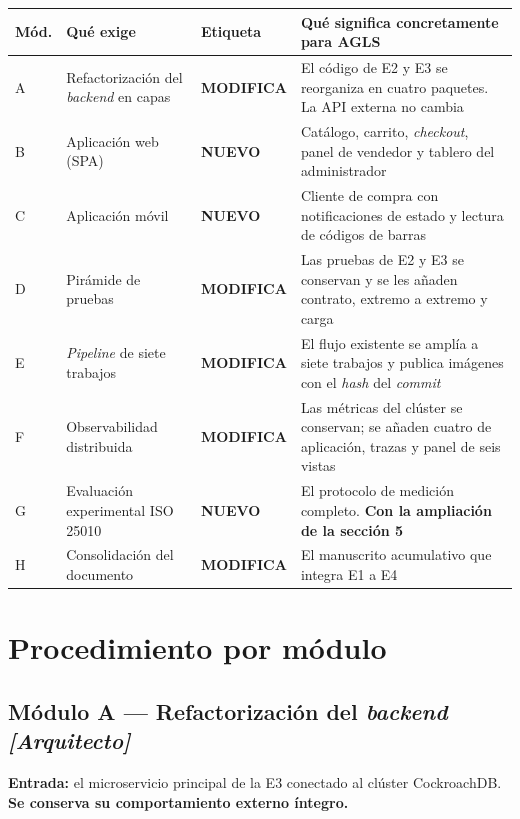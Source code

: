 \documentclass[11pt,a4paper]{article}
\newcommand{\cambia}{\cellcolor{filaCambia}\textbf{MODIFICA}}
\newcommand{\nuevo}{\cellcolor{filaNuevo}\textbf{NUEVO}}
\begin{document}
\begin{center}
	\footnotesize
	\begin{longtable}{@{}p{1.0cm}p{3.5cm}p{1.6cm}p{9.0cm}@{}}
		\toprule
		\textbf{Mód.} & \textbf{Qué exige} & \textbf{Etiqueta} & \textbf{Qué significa concretamente para AGLS} \\
		\midrule
		\endhead
		A & Refactorización del \emph{backend} en capas & \cambia & El código de E2 y E3 se reorganiza en cuatro paquetes. La API externa no cambia \\
		\addlinespace
		B & Aplicación web (SPA) & \nuevo & Catálogo, carrito, \emph{checkout}, panel de vendedor y tablero del administrador \\
		\addlinespace
		C & Aplicación móvil & \nuevo & Cliente de compra con notificaciones de estado y lectura de códigos de barras \\
		\addlinespace
		D & Pirámide de pruebas & \cambia & Las pruebas de E2 y E3 se conservan y se les añaden contrato, extremo a extremo y carga \\
		\addlinespace
		E & \emph{Pipeline} de siete trabajos & \cambia & El flujo existente se amplía a siete trabajos y publica imágenes con el \emph{hash} del \emph{commit} \\
		\addlinespace
		F & Observabilidad distribuida & \cambia & Las métricas del clúster se conservan; se añaden cuatro de aplicación, trazas y panel de seis vistas \\
		\addlinespace
		G & Evaluación experimental ISO 25010 & \nuevo & El protocolo de medición completo. \textbf{Con la ampliación de la sección 5} \\
		\addlinespace
		H & Consolidación del documento & \cambia & El manuscrito acumulativo que integra E1 a E4 \\
		\bottomrule
	\end{longtable}
\end{center}

\section{Procedimiento por módulo}

\subsection{Módulo A --- Refactorización del \emph{backend} \emph{[Arquitecto]}}

\textbf{Entrada:} el microservicio principal de la E3 conectado al clúster CockroachDB. \textbf{Se conserva su comportamiento externo íntegro.}
\end{document}
